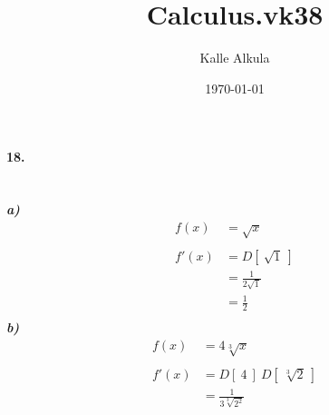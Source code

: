 \documentclass[12pt, a4paper]{article}
\author{Kalle Alkula}
\title{Calculus.vk38}
\date\today
\begin{document}
\maketitle
\thispagestyle{fancy}
    \paragraph*{18.}
        \textit{
            \\
            \textbf{a)}
        }
    \begin{equation*}
        \begin{split}
        f(x) &=\sqrt{x}\\\\
        f'(x) &= D[~\sqrt{1}~]\\
        &=\frac{1}{2\sqrt{1}}\\
        &= \frac{1}{2}\\
        \end{split}
    \end{equation*}
    \textit{
        \textbf{b)}
    }
    \begin{equation*}
        \begin{split}
            f(x)&= 4\sqrt[3]{x}\\\\
            f'(x)&= D[~4~]~D[~\sqrt[3]{2}~]\\
            &= \frac{1}{3\sqrt[3]{2^2}}\\
        \end{split}
    \end{equation*}
    \newpage
\end{document}
